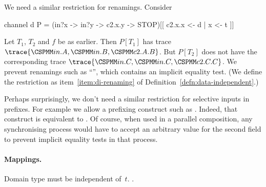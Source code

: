 We need a similar restriction for renamings.  Consider
%
\begin{cspm}
channel d
P = (in?x -> in?y -> c2.x.y -> STOP)[[ c2.x.x <- d | x <- t ]]
\end{cspm}
%
Let $T_1$, $T_2$ and $f$ be as earlier.  Then $P[T_1]$ has trace
$\trace{\M{in}.A, \M{in}.B, \M{c2}.A.B}$.  But $P[T_2]$ does not have the
corresponding trace $\trace{\M{in}.C, \M{in}.C, \M{c2}.C.C}$.  We prevent
renamings such as ``'', which contains an implicit equality
test.  (We define the restriction as item~\ref{item:di-renaming} of
Definition~\ref{defn:data-independent}.) 

Perhaps surprisingly, we don't need a similar restriction for selective inputs
in prefixes.  For example we allow a prefixing construct such
as .  Indeed, that construct is equivalent
to .  Of course, when used in a parallel composition, any
synchronising process would have to accept an arbitrary value for the second
field to prevent implicit equality tests in that process.



\paragraph{Mappings.}  Domain type must be independent
of~$t$.  \framebox{\ldots}. 

